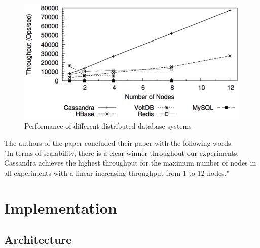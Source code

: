 \documentclass[a4paper]{article}
\begin{document}
\begin{figure}[h!]
	\centering
	\includegraphics[scale=0.5]{images/throughputCassandra.png}
	\caption{Performance of different distributed database systems}
	\label{throughput_cassandra}
\end{figure}

The authors of the paper concluded their paper with the following words:\\

"In terms of scalability, there is a clear winner throughout our experiments. Cassandra achieves the highest throughput for the maximum number of nodes in all experiments with a linear increasing throughput from 1 to 12 nodes."

\section{Implementation}
\subsection{Architecture}
\end{document}
